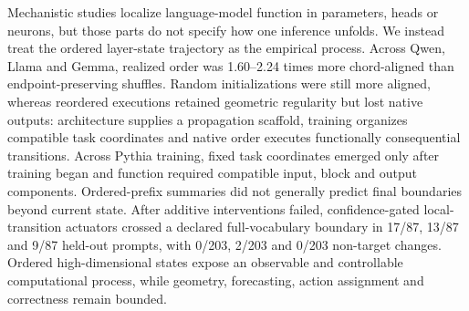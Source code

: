 Mechanistic studies localize language-model function in parameters, heads or neurons, but those parts do not specify how one inference unfolds. We instead treat the ordered layer-state trajectory as the empirical process. Across Qwen, Llama and Gemma, realized order was 1.60--2.24 times more chord-aligned than endpoint-preserving shuffles. Random initializations were still more aligned, whereas reordered executions retained geometric regularity but lost native outputs: architecture supplies a propagation scaffold, training organizes compatible task coordinates and native order executes functionally consequential transitions. Across Pythia training, fixed task coordinates emerged only after training began and function required compatible input, block and output components. Ordered-prefix summaries did not generally predict final boundaries beyond current state. After additive interventions failed, confidence-gated local-transition actuators crossed a declared full-vocabulary boundary in 17/87, 13/87 and 9/87 held-out prompts, with 0/203, 2/203 and 0/203 non-target changes. Ordered high-dimensional states expose an observable and controllable computational process, while geometry, forecasting, action assignment and correctness remain bounded.
